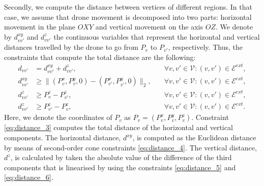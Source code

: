 \documentclass[12pt]{elsarticle}
\begin{document}
Secondly, we compute the distance between vertices of different regions. In that case, we assume that drone movement is decomposed into two parts: horizontal movement in the plane $OXY$ and vertical movement on the axis $OZ$. We denote by $d_{vv'}^{xy}$ and $d_{vv'}^z$ the continuous variables that represent the horizontal and vertical distances travelled by the drone to go from $P_v$ to $P_{v'}$, respectively. Thus, the constraints that compute the total distance are the following:
\begin{align*}
    d_{vv'}&=d_{vv'}^{xy}+d_{vv'}^z,&\quad\forall v,v'\in\mathcal V:(v,v')\in\mathcal E^{ext},\label{eq:distance_3}\tag{$Dist-C_3$}\\
    d_{vv'}^{xy}&\geq\|(P_v^x,P_v^y,0)-(P_{v'}^x,P_{v'}^y,0)\|_2,&\quad\forall v,v'\in\mathcal V:(v,v')\in\mathcal E^{ext},\label{eq:distance_4}\tag{$Dist-C_4$}\\
    d_{vv'}^z&\geq P_v^z - P_{v'}^z,&\quad\forall v,v'\in\mathcal V:(v,v')\in\mathcal E^{ext},\label{eq:distance_5}\tag{$Dist-C_5$}\\
    d_{vv'}^z&\geq P_{v'}^z - P_v^z,&\quad\forall v,v'\in\mathcal V:(v,v')\in\mathcal E^{ext}.\label{eq:distance_6}\tag{$Dist-C_6$}
\end{align*}
Here, we denote the coordinates of $P_v$ as $P_v=(P_v^x,P_v^y,P_v^z)$. Constraint \eqref{eq:distance_3} computes the total distance of the horizontal and vertical components. The horizontal distance, $d^{xy}$, is computed as the Euclidean distance by means of second-order cone constraints \eqref{eq:distance_4}. The vertical distance, $d^z$, is calculated by taken the absolute value of the difference of the third components that is linearised by using the constraints \eqref{eq:distance_5} and \eqref{eq:distance_6}.
\end{document}
